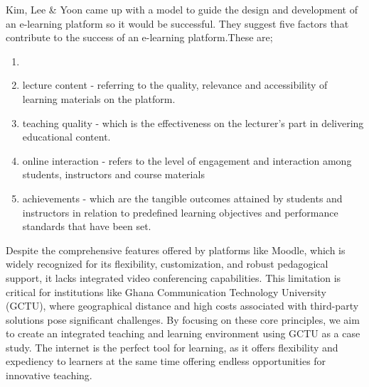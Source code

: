 \documentclass[a4paper,12pt]{article}  %
\begin{document}
Kim, Lee \& Yoon \cite{kim2023better}came up with a model to guide the design
and development of an e-learning platform so it would be successful. They
suggest five factors that contribute to the success of an e-learning
platform.These are;
\begin{enumerate}
      \item {}
      \item lecture content - referring to the quality, relevance and accessibility of
            learning materials on the platform.\\
      \item teaching quality - which is the effectiveness on the lecturer's part in
            delivering educational content.\\
      \item online interaction - refers to the level of engagement and interaction among
            students, instructors and course materials\\
      \item achievements - which are the tangible outcomes attained by students and
            instructors in relation to predefined learning objectives and performance
            standards that have been set.\\
\end{enumerate}
Despite the comprehensive features offered by platforms like Moodle, which is widely recognized for its flexibility, customization, and robust pedagogical support, it lacks integrated video conferencing capabilities. This limitation is critical for institutions like Ghana Communication Technology University (GCTU), where geographical distance and high costs associated with third-party solutions pose significant challenges. By focusing on these core principles, we aim to create an integrated teaching and learning environment using GCTU as a case study. The internet is the perfect tool for learning, as it offers flexibility and expediency to learners at the same time offering endless opportunities for innovative teaching.
\end{document}
